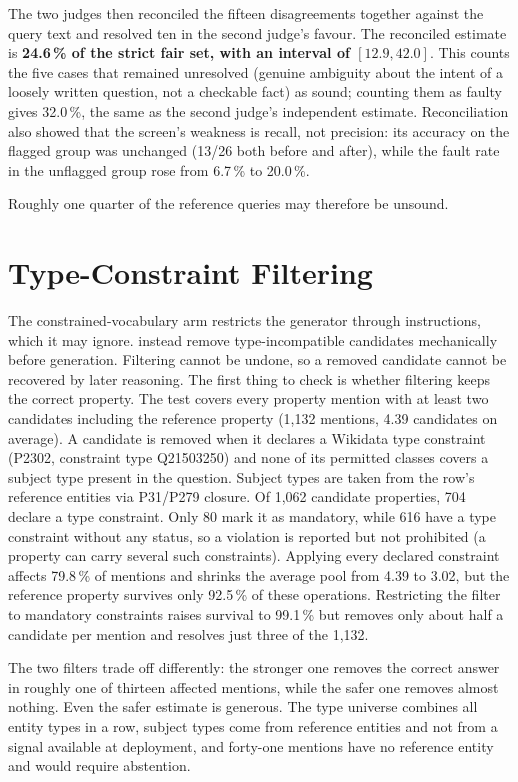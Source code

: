 The two judges then reconciled the fifteen disagreements together against the query text and resolved ten in the second judge's favour.
The reconciled estimate is \textbf{24.6\,\% of the strict fair set, with an interval of $[12.9, 42.0]$}.
This counts the five cases that remained unresolved (genuine ambiguity about the intent of a loosely written question, not a checkable fact) as sound; counting them as faulty gives 32.0\,\%, the same as the second judge's independent estimate.
Reconciliation also showed that the screen's weakness is recall, not precision: its accuracy on the flagged group was unchanged (13/26 both before and after), while the fault rate in the unflagged group rose from 6.7\,\% to 20.0\,\%.

Roughly one quarter of the reference queries may therefore be unsound.

\section{Type-Constraint Filtering}
\label{app:filter}

The constrained-vocabulary arm restricts the generator through instructions, which it may ignore.
\citet{zhang2026saga} instead remove type-incompatible candidates mechanically before generation.
Filtering cannot be undone, so a removed candidate cannot be recovered by later reasoning.
The first thing to check is whether filtering keeps the correct property.
The test covers every property mention with at least two candidates including the reference property (1,132 mentions, 4.39 candidates on average).
A candidate is removed when it declares a Wikidata type constraint (P2302, constraint type Q21503250) and none of its permitted classes covers a subject type present in the question.
Subject types are taken from the row's reference entities via P31/P279 closure.
Of 1,062 candidate properties, 704 declare a type constraint.
Only 80 mark it as mandatory, while 616 have a type constraint without any status, so a violation is reported but not prohibited (a property can carry several such constraints).
Applying every declared constraint affects 79.8\,\% of mentions and shrinks the average pool from 4.39 to 3.02, but the reference property survives only 92.5\,\% of these operations.
Restricting the filter to mandatory constraints raises survival to 99.1\,\% but removes only about half a candidate per mention and resolves just three of the 1,132.

The two filters trade off differently: the stronger one removes the correct answer in roughly one of thirteen affected mentions, while the safer one removes almost nothing.
Even the safer estimate is generous.
The type universe combines all entity types in a row, subject types come from reference entities and not from a signal available at deployment, and forty-one mentions have no reference entity and would require abstention.

